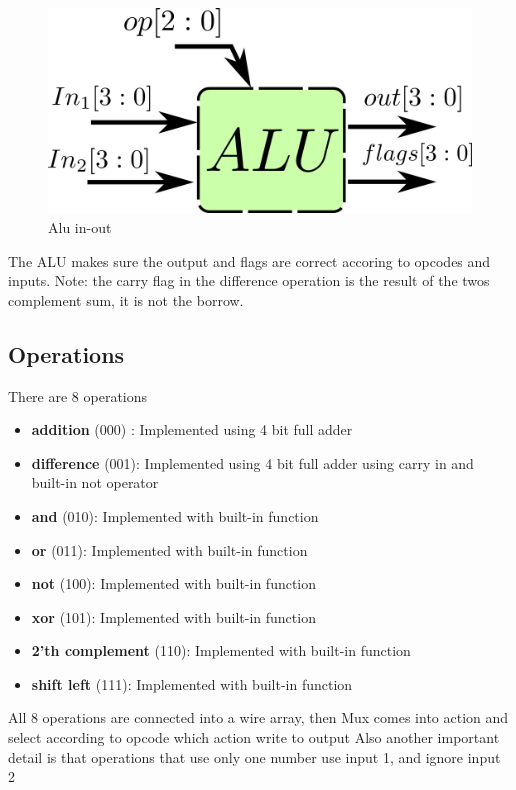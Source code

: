 \begin{figure}[H]
  \begin{centering}
  \includegraphics[scale=1]{data/alu.png}
  \par\end{centering}
  \caption{Alu in-out}
\end{figure}

The ALU makes sure the output and flags are correct accoring to opcodes and inputs.
Note: the carry flag in the difference operation is the result of the twos complement sum, it is not the borrow.

\subsection*{Operations}
There are 8 operations
\begin{itemize}
  \item \textbf{addition} (000) : Implemented using 4 bit full adder
  \item \textbf{difference} (001): Implemented using 4 bit full adder using carry in and built-in not operator
  \item \textbf{and} (010): Implemented with built-in function
  \item \textbf{or} (011): Implemented with built-in function
  \item \textbf{not} (100): Implemented with built-in function
  \item \textbf{xor} (101): Implemented with built-in function
  \item \textbf{2'th complement} (110): Implemented with built-in function
  \item \textbf{shift left} (111): Implemented with built-in function
\end{itemize}

All 8 operations are connected into a wire array, then Mux comes into action and select according to opcode which action write to output
Also another important detail is that operations that use only one number use input 1, and ignore input 2

